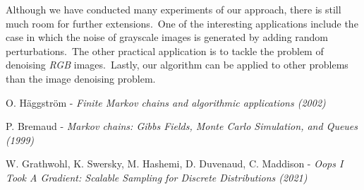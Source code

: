 \documentclass[a4paper, 11pt, onecolumn, openany, titlepage]{report}
\theoremstyle{default_theorem_style}\newtheorem{theorem}{Theorem}
\theoremstyle{default_theorem_style}\newtheorem{definition}{Definition}
\begin{document}
Although we have conducted many experiments of our approach, there is still much room for further extensions.\ One of
the interesting applications include the case in which the noise of grayscale images is generated by adding random
perturbations.\ The other practical application is to tackle the problem of denoising \textit{RGB} images.\ Lastly, our
algorithm can be applied to other problems than the image denoising problem.


\begin{thebibliography}{9}

O. Häggström - \textit{Finite Markov chains and algorithmic applications (2002)}

P. Bremaud - \textit{Markov chains: Gibbs Fields, Monte Carlo Simulation, and Queues (1999)}

W. Grathwohl, K. Swersky, M. Hashemi, D. Duvenaud, C. Maddison -
\textit{Oops I Took A Gradient: Scalable Sampling for Discrete Distributions (2021)}

\end{thebibliography}
\end{document}

